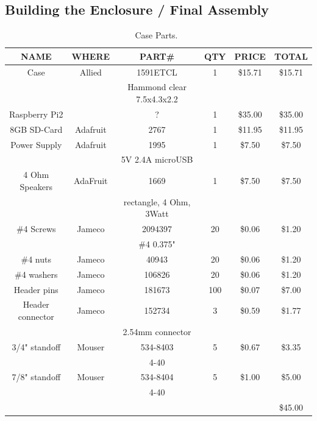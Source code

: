 \documentclass[11pt]{article}
\begin{document}
\subsection{Building the Enclosure / Final Assembly}


\begin{table}

\caption{Case Parts.~\label{table:case_parts}}
\centering
\begin{tabular}{|c|c|c|c|c|c|}
\hline
NAME		& WHERE		& PART\#	           & QTY & PRICE    & TOTAL \\
\hline
\hline
Case		& Allied	& 1591ETCL		   & 1   & \$15.71   & \$15.71 \\
		&		& Hammond clear 7.5x4.3x2.2&     &           &         \\
\hline
Raspberry Pi2	&		&		?	   & 1   & \$35.00   & \$35.00 \\
\hline
8GB SD-Card	& Adafruit	& 2767			   & 1   & \$11.95   & \$11.95 \\
\hline
Power Supply	& Adafruit	& 1995			   & 1   & \$7.50    & \$7.50  \\
		&		& 5V 2.4A microUSB	   &     &           &         \\
\hline
4 Ohm Speakers	& AdaFruit	& 1669			   & 1	 & \$7.50    & \$7.50  \\ 
		&		& rectangle, 4 Ohm, 3Watt  &     &           &         \\
\hline
\#4 Screws	& Jameco	& 2094397	  	   & 20  & \$0.06   & \$1.20  \\
		&		& \#4 0.375"		   &     &          &         \\
\hline
\#4 nuts	& Jameco	& 40943	   	           & 20  & \$0.06   & \$1.20  \\
\hline
\#4 washers	& Jameco	& 106826	   	   & 20  & \$0.06   & \$1.20  \\
\hline
Header pins	& Jameco	& 181673	           & 100 & \$0.07   & \$7.00  \\
\hline
Header connector& Jameco	& 152734	           & 3   & \$0.59   & \$1.77  \\
		&		& 2.54mm connector	   &     &          &         \\
\hline
3/4" standoff	& Mouser	& 534-8403	           & 5   & \$0.67   & \$3.35   \\
		&		& 4-40			   &     &          &          \\
\hline
7/8" standoff	& Mouser	& 534-8404		   & 5   & \$1.00   & \$5.00   \\
		&		& 4-40			   &     &          &          \\
\hline
\hline
		&		&		&	&		& \$45.00 \\
\hline
\end{tabular}
\end{table}
\end{document}
